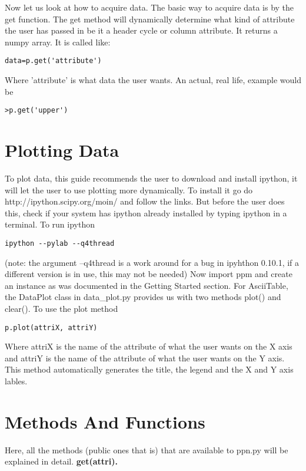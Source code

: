 Now let us look at how to acquire data.
\newline
The basic way to acquire data is by the get function. The get method will dynamically determine what kind of attribute the user has passed in
be it a header cycle or column attribute.  It returns a numpy array.  It is called like:
\begin{verbatim}
data=p.get('attribute')
\end{verbatim}
Where 'attribute' is what data the user wants.
An actual, real life, example would be
\begin{verbatim}
>p.get('upper')
\end{verbatim}

\section{Plotting Data}
To plot data, this guide recommends the user to download and install ipython, it will let the user to use plotting more dynamically. To install it go do http://ipython.scipy.org/moin/ and follow the links.
But before the user does this, check if your system has ipython already installed by typing ipython in a terminal.
\newline
To run ipython
\begin{verbatim}
ipython --pylab --q4thread
\end{verbatim}
(note: the argument --q4thread is a work around for a bug in ipyhthon 0.10.1, if a different version is in use, this may not be needed)
\newline
Now import ppm and create an instance as was documented in the Getting Started section.
For AsciiTable, the DataPlot class in  data\_plot.py provides us with two methods plot() and clear().
\newline
To use the plot method
\begin{verbatim}
p.plot(attriX, attriY)
\end{verbatim}
Where attriX is the name of the attribute of what the user wants on the X axis and attriY is the name of the attribute of what the user wants on the Y axis.
This method automatically generates the title, the legend and the X and Y axis lables.

\section{Methods And Functions}
Here, all the methods (public ones that is) that are available to ppn.py will be explained in detail.
\newline\newline
{\bf get(attri).}
\newline  

